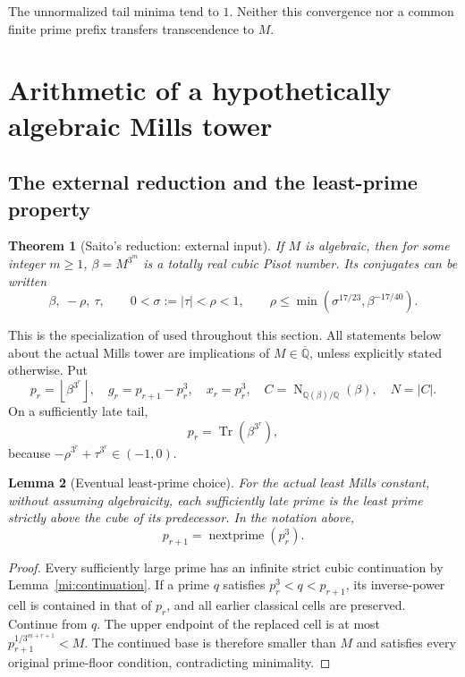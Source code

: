 \documentclass[11pt,a4paper]{article}
\numberwithin{equation}{section}
\newtheorem{theorem}{Theorem}[section]
\newtheorem{lemma}[theorem]{Lemma}
\theoremstyle{definition}
\theoremstyle{remark}
\newcommand{\A}{\overline{\mathbb Q}}
\newcommand{\Q}{\mathbb Q}
\newcommand{\Tr}{\operatorname{Tr}}
\newcommand{\Norm}{\operatorname{N}}
\newcommand{\floor}[1]{\left\lfloor #1\right\rfloor}
\begin{document}
The unnormalized tail minima tend to \(1\).
Neither this convergence nor a common finite prime prefix
transfers transcendence to \(M\).

\section{Arithmetic of a hypothetically algebraic Mills tower}
\label{mi:cubic}

\subsection{The external reduction and the least-prime property}

\begin{theorem}[Saito's reduction: external input]
\label{mi:saito}
If \(M\) is algebraic, then for some integer \(m\ge1\),
\(\beta=M^{3^m}\) is a totally real cubic Pisot number. Its
conjugates can be written
\[
 \beta,\ -\rho,\ \tau,\qquad
 0<\sigma:=|\tau|<\rho<1,
 \qquad
 \rho\le\min(\sigma^{17/23},\beta^{-17/40}).
\]
\end{theorem}

This is the specialization of
\cite[Theorem~1.7]{SaitoVariants} used throughout this section.
All statements below about the actual Mills tower are implications
of \(M\in\A\), unless explicitly stated otherwise.
Put
\[
 p_r=\floor{\beta^{3^r}},\quad
 g_r=p_{r+1}-p_r^3,\quad x_r=p_r^3,\quad
 C=\Norm_{\Q(\beta)/\Q}(\beta),\quad N=|C|.
\]
On a sufficiently late tail,
\[
 p_r=\Tr(\beta^{3^r}),
\]
because \(-\rho^{3^r}+\tau^{3^r}\in(-1,0)\).

\begin{lemma}[Eventual least-prime choice]
\label{mi:least-prime}
For the actual least Mills constant, without assuming
algebraicity, each sufficiently late prime is the least prime
strictly above the cube of its predecessor. In the notation above,
\[
 p_{r+1}=\operatorname{nextprime}(p_r^3).
\]
\end{lemma}

\begin{proof}
Every sufficiently large prime has an infinite strict cubic
continuation by Lemma~\ref{mi:continuation}.
If a prime \(q\) satisfies \(p_r^3<q<p_{r+1}\), its inverse-power
cell is contained in that of \(p_r\), and all earlier classical
cells are preserved. Continue from \(q\).
The upper endpoint of the replaced cell is at most
\(p_{r+1}^{1/3^{m+r+1}}<M\).
The continued base is therefore smaller than \(M\) and satisfies
every original prime-floor condition, contradicting minimality.
\end{proof}
\end{document}

